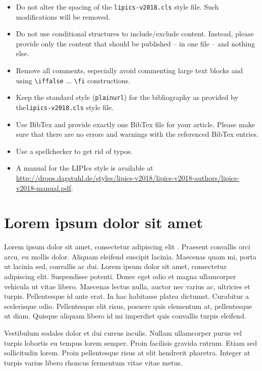 \documentclass[a4paper,USenglish,english]{lipics-v2018}
\begin{document}
\begin{itemize}
\item Do not alter the spacing of the  \verb+lipics-v2018.cls+ style file. Such modifications will be removed.
\item Do not use conditional structures to include/exclude content. Instead, please provide only the content that should be published -- in one file -- and nothing else.
\item Remove all comments, especially avoid commenting large text blocks and using \verb+\iffalse+ $\ldots$ \verb+\fi+ constructions.
\item Keep the standard style (\verb+plainurl+) for the bibliography as provided by the\linebreak \verb+lipics-v2018.cls+ style file.
\item Use BibTex and provide exactly one BibTex file for your article. Please make sure that there are no errors and warnings with the referenced BibTex entries.
\item Use a spellchecker to get rid of typos.
\item A manual for the LIPIcs style is available at \url{http://drops.dagstuhl.de/styles/lipics-v2018/lipics-v2018-authors/lipics-v2018-manual.pdf}.
\end{itemize}


\section{Lorem ipsum dolor sit amet}

Lorem ipsum dolor sit amet, consectetur adipiscing elit \cite{DBLP:journals/cacm/Knuth74}. Praesent convallis orci arcu, eu mollis dolor. Aliquam eleifend suscipit lacinia. Maecenas quam mi, porta ut lacinia sed, convallis ac dui. Lorem ipsum dolor sit amet, consectetur adipiscing elit. Suspendisse potenti. Donec eget odio et magna ullamcorper vehicula ut vitae libero. Maecenas lectus nulla, auctor nec varius ac, ultricies et turpis. Pellentesque id ante erat. In hac habitasse platea dictumst. Curabitur a scelerisque odio. Pellentesque elit risus, posuere quis elementum at, pellentesque ut diam. Quisque aliquam libero id mi imperdiet quis convallis turpis eleifend. 

\begin{lemma}
\label{lemma:lorem}
Vestibulum sodales dolor et dui cursus iaculis. Nullam ullamcorper purus vel turpis lobortis eu tempus lorem semper. Proin facilisis gravida rutrum. Etiam sed sollicitudin lorem. Proin pellentesque risus at elit hendrerit pharetra. Integer at turpis varius libero rhoncus fermentum vitae vitae metus.
\end{lemma}
\end{document}
